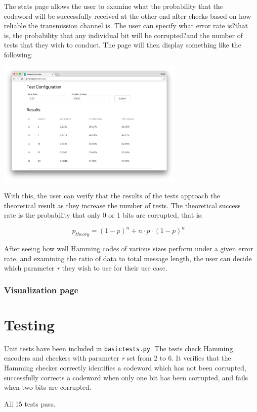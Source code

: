 \documentclass[11pt, oneside]{article}   	%
\begin{document}
The stats page allows the user to examine what the probability that the codeword will be successfully received at the other end after checks based on how reliable the transmission channel is. The user can specify what error rate is?that is, the probability that any individual bit will be corrupted?and the number of tests that they wish to conduct. The page will then display something like the following:

\begin{center}
\includegraphics[width=345px]{stats2}
\end{center}

With this, the user can verify that the results of the tests approach the theoretical result as they increase the number of tests. The theoretical success rate is the probability that only 0 or 1 bits are corrupted, that is:

$$
p_{theory} = (1-p)^n + n \cdot p \cdot (1-p)^n
$$

After seeing how well Hamming codes of various sizes perform under a given error rate, and examining the ratio of data to total message length, the user can decide which parameter \textit{r} they wish to use for their use case. 

\subsubsection*{Visualization page}

\section*{Testing}

Unit tests have been included in \verb!basictests.py!. The tests check Hamming encoders and checkers with parameter \textit{r} set from 2 to 6. It verifies that the Hamming checker correctly identifies a codeword which has not been corrupted, successfully corrects a codeword when only one bit has been corrupted, and fails when two bits are corrupted. 

All 15 tests pass. 
\end{document}
